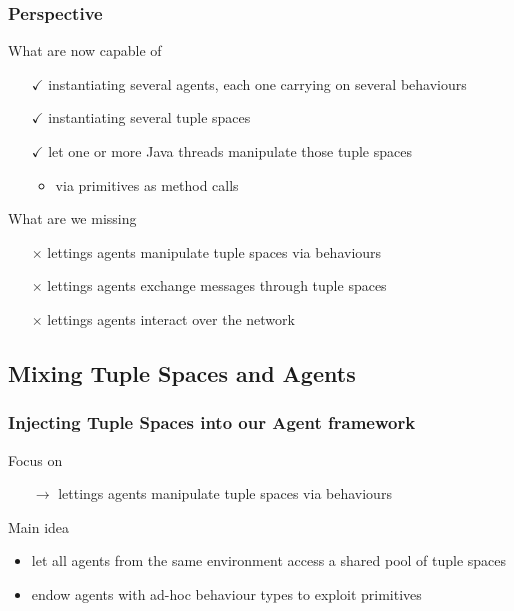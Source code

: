 \documentclass[presentation]{beamer}\mode<presentation>{\usetheme{AMSCesenaPurpleAndGold}}
\begin{document}
\begin{frame}
\frametitle{Perspective}

	\begin{block}{What are now capable of}
		\begin{itemize}
			\item[$\checkmark$] instantiating several \alert{agents}, each one carrying on several \alert{behaviours}
			\item[$\checkmark$] instantiating several \alert{tuple spaces}
			\item[$\checkmark$] let one or more \alert{Java threads} manipulate those tuple spaces
			\begin{itemize}
				\item via \linda{} primitives as method calls
			\end{itemize}
		\end{itemize}
	\end{block}

	\vfill

	\begin{alertblock}{What are we missing}
		\begin{itemize}
			\item[$\times$] lettings agents manipulate tuple spaces \alert{via behaviours}
			\item[$\times$] lettings agents \alert{exchange messages} through tuple spaces
			\item[$\times$] lettings agents \alert{interact} over the network
		\end{itemize}
	\end{alertblock}

\end{frame}

\subsection{Mixing Tuple Spaces and Agents}

\begin{frame}
	\frametitle{Injecting Tuple Spaces into our Agent framework}

	\begin{alertblock}{Focus on}
		\begin{itemize}
			\item[$\rightarrow$] lettings agents manipulate tuple spaces \alert{via behaviours}
		\end{itemize}
	\end{alertblock}

	\pause

	\begin{exampleblock}{Main idea}
		\begin{itemize}
			\item let all agents from the same environment access a \alert{shared} pool of tuple spaces
			\item endow agents with ad-hoc behaviour types to exploit \linda{} primitives
		\end{itemize}
	\end{exampleblock}

\end{frame}
\end{document}
